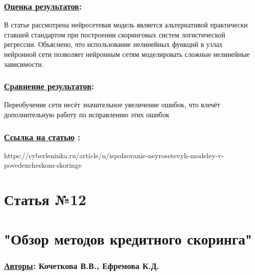 \documentclass[a4paper,14pt]{article}
\begin{document}
\subsubsection*{\underline{Оценка результатов}:}
В статье рассмотрена нейросетевая модель является альтернативой практически ставшей стандартом при построении скоринговых систем логистической регрессии. Объяснено, что использование нелинейных функций в узлах нейронной сети позволяет нейронным сетям моделировать сложные нелинейные зависимости. 
\subsubsection*{\underline{Сравнение результатов}:}
Переобучение сети несёт значительное увеличение ошибок, что влечёт дополнительную работу по исправлению этих ошибок
\subsubsection*{\underline{Ссылка на статью} :}
https://cyberleninka.ru/article/n/ispolzovanie-neyrosetevyh-modeley-v-povedencheskom-skoringe


\newpage



\section*{Статья №12}
\section*{"Обзор методов кредитного скоринга"}
\subsubsection*{\underline {Авторы}: Кочеткова В.В., Ефремова К.Д.}
\end{document}
